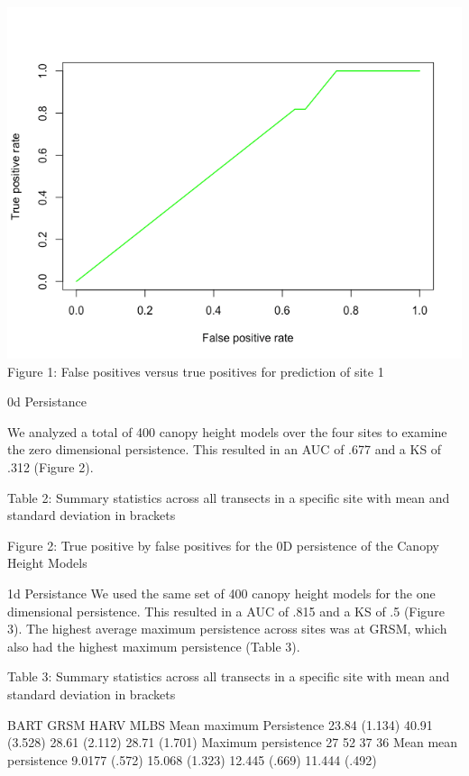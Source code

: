 \documentclass[10pt]{article}
\begin{document}
\includegraphics[scale = 0.05]{transect_roc}\\

Figure 1: False positives versus true positives for prediction of site 1


0d Persistance

We analyzed a total of 400 canopy height models over the four sites to examine the zero dimensional persistence. This resulted in an AUC of .677 and a KS of .312 (Figure 2).






Table 2: Summary statistics across all transects in a specific site with mean and standard deviation in brackets




Figure 2: True positive by false positives for the 0D persistence of the Canopy Height Models

1d Persistance
We used the same set of 400 canopy height models for the one dimensional persistence. This resulted in a AUC of .815 and a KS of .5 (Figure 3). The highest average maximum persistence across sites was at GRSM, which also had the highest maximum persistence (Table 3).






Table 3: Summary statistics across all transects in a specific site with mean and standard deviation in brackets


BART
GRSM
HARV
MLBS
Mean maximum Persistence
23.84 (1.134)
40.91 (3.528)
28.61 (2.112)
28.71 (1.701)
Maximum persistence
27
52
37
36
Mean mean persistence
9.0177 (.572)
15.068 (1.323)
12.445 (.669)
11.444 (.492)
\end{document}
